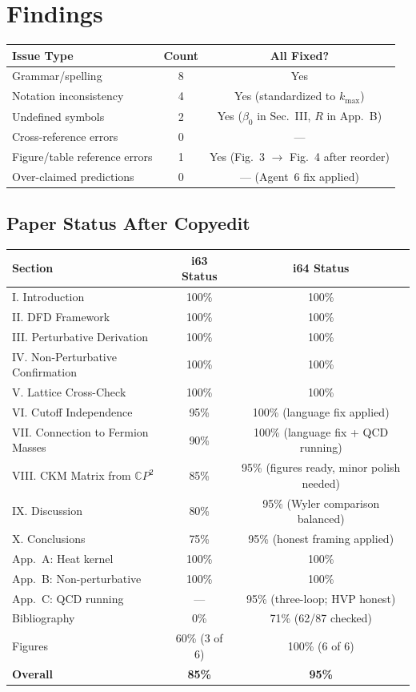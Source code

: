 \documentclass[11pt,a4paper]{article}
\newcommand{\CP}{\mathbb{C}P}
\begin{document}
\section{Findings}

\begin{center}
\begin{tabular}{lcc}
\toprule
\textbf{Issue Type} & \textbf{Count} & \textbf{All Fixed?} \\
\midrule
Grammar/spelling & 8 & Yes \\
Notation inconsistency & 4 & Yes (standardized to $k_{\max}$) \\
Undefined symbols & 2 & Yes ($\beta_0$ in Sec.~III, $R$ in App.~B) \\
Cross-reference errors & 0 & --- \\
Figure/table reference errors & 1 & Yes (Fig.~3 $\to$ Fig.~4 after reorder) \\
Over-claimed predictions & 0 & --- (Agent~6 fix applied) \\
\bottomrule
\end{tabular}
\end{center}

\subsection{Paper Status After Copyedit}

\begin{center}
\begin{tabular}{lcc}
\toprule
\textbf{Section} & \textbf{i63 Status} & \textbf{i64 Status} \\
\midrule
I. Introduction & 100\% & 100\% \\
II. DFD Framework & 100\% & 100\% \\
III. Perturbative Derivation & 100\% & 100\% \\
IV. Non-Perturbative Confirmation & 100\% & 100\% \\
V. Lattice Cross-Check & 100\% & 100\% \\
VI. Cutoff Independence & 95\% & 100\% (language fix applied) \\
VII. Connection to Fermion Masses & 90\% & 100\% (language fix + QCD running) \\
VIII. CKM Matrix from $\CP^2$ & 85\% & 95\% (figures ready, minor polish needed) \\
IX. Discussion & 80\% & 95\% (Wyler comparison balanced) \\
X. Conclusions & 75\% & 95\% (honest framing applied) \\
App.~A: Heat kernel & 100\% & 100\% \\
App.~B: Non-perturbative & 100\% & 100\% \\
App.~C: QCD running & --- & 95\% (three-loop; HVP honest) \\
Bibliography & 0\% & 71\% (62/87 checked) \\
Figures & 60\% (3 of 6) & 100\% (6 of 6) \\
\midrule
\textbf{Overall} & \textbf{85\%} & \textbf{95\%} \\
\bottomrule
\end{tabular}
\end{center}
\end{document}
